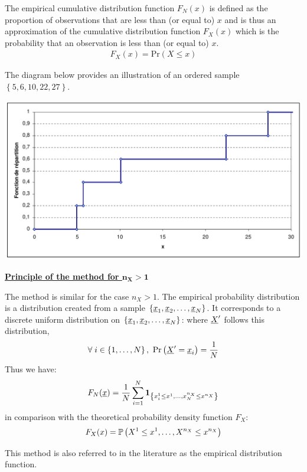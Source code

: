 {  The empirical cumulative distribution function $F_N(x)$ is defined as the proportion of observations that are less than (or equal to) $x$ and is thus an approximation of the cumulative distribution function $F_X(x)$ which is the probability that an observation is less than (or equal to) $x$.
  \begin{align*}
    F_X(x) = \textrm{Pr} \left( X \leq x \right)
  \end{align*}

  The diagram below provides an illustration of an ordered sample $\left\{5,6,10,22,27\right\}$.
  \begin{center}
    \includegraphics[scale=0.5]{Figures/foncrep.pdf}
  \end{center}
  \vspace{2mm}

  \underline{\textbf{Principle of the method for $\boldsymbol{n_X > 1}$}} \vspace{2mm}

  The method is similar for the case $n_X>1$. The empirical probability distribution is a distribution created from a sample $\left\{{\underline{x}}_1, {\underline{x}}_2, \ldots, {\underline{x}}_N\right\}$. It corresponds to a discrete uniform distribution on $\left\{{\underline{x}}_1, {\underline{x}}_2, \ldots, {\underline{x}}_N\right\}$: where ${\underline{X}}'$ follows this distribution,
  \begin{align*}
    \forall \; i \in \left\{1,\ldots, N\right\} ,\ \textrm{Pr}\left(\vect{X}'=\vect{x}_i\right) = \frac{1}{N}
  \end{align*}
  Thus we have:
  \begin{align*}
    F_N({\underline{x}}) = \frac{1}{N} \sum_{i=1}^N \mathbf{1}_{ \left\{ x^1_i \leq x^1,\ldots,x^{n_X}_N \leq x^{n_X} \right\} }
  \end{align*}
  in comparison with the theoretical probability density function $F_X$:
  \begin{align*}
    F_X(x) = {\mathbb P}\left( X^1 \leq x^1,\ldots,X^{n_X} \leq x^{n_X} \right)
  \end{align*}
}
{
  This method is also referred to in the literature as the empirical distribution function.
}

